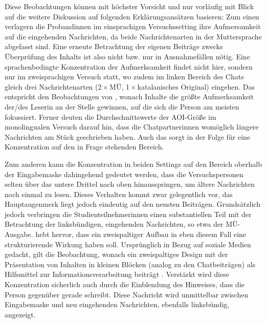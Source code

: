 \begin{sloppypar}
Diese Beobachtungen können mit höchster Vorsicht und nur vorläufig mit Blick auf die weitere Diskussion auf folgenden Erklärungsansätzen basieren: Zum einen verlagern die Proband{\textperiodcentered}innen im einsprachigen Versuchssetting ihre Aufmersamkeit auf die eingehenden Nachrichten, da beide Nachrichtenarten in der Muttersprache abgefasst sind. Eine erneute Betrachtung der eigenen Beiträge zwecks Überprüfung des Inhalts ist also nicht bzw. nur in Ausnahmefällen nötig. Eine sprachenbedingte Konzentration der Aufmerksamkeit findet nicht hier, sondern nur im zweisprachigen Versuch statt, wo zudem im linken Bereich des Chats gleich drei Nachrichtenarten (2\,$\times$\,MÜ, 1\,$\times$\,katalanisches Original) eingehen. Das entspricht den Beobachtungen von \citet[169]{bergstrom_chapter_2014}, wonach Inhalte die größte Aufmerksamkeit der/des Leser{\textperiodcentered}in an der Stelle gewinnen, auf die sich die Person am meisten fokussiert. Ferner deuten die Durchschnittswerte der AOI-Größe im monolingualen Versuch darauf hin, dass die Chatpartner{\textperiodcentered}innen womöglich längere Nachrichten am Stück geschrieben haben. Auch das sorgt in der Folge für eine Konzentration auf den in Frage stehenden Bereich.
\end{sloppypar}

Zum anderen kann die Konzentration in beiden Settings auf den Bereich oberhalb der Eingabemaske dahingehend gedeutet werden, dass die Versuchspersonen selten über das untere Drittel nach oben hinausspringen, um ältere Nachrichten noch einmal zu lesen. Dieses Verhalten kommt zwar gelegentlich vor, das Hauptaugenmerk liegt jedoch eindeutig auf den neusten Beiträgen. Grundsätzlich jedoch verbringen die Studienteilnehmer{\textperiodcentered}innen einen substantiellen Teil mit der Betrachtung der linksbündigen, eingehenden Nachrichten, so etwa der MÜ-Ausgabe. \citet[229]{bergstrom_9_2014} hebt hervor, dass ein zweispaltiger Aufbau in eben diesem Fall eine strukturierende Wirkung haben soll. Ursprünglich in Bezug auf soziale Medien gedacht, gilt die Beobachtung, wonach ein zweispaltiges Design mit der Präsentation von Inhalten in kleinen Blöcken (analog zu den Chatbeiträgen) als Hilfsmittel zur Informationsverarbeitung beiträgt \citep[229\psq]{bergstrom_9_2014}. Verstärkt wird diese Konzentration sicherlich auch durch die Einblendung des Hinweises, dass die Person gegenüber gerade schreibt. Diese Nachricht wird unmittelbar zwischen Eingabemaske und neu eingehenden Nachrichten, ebenfalls linksbündig, angezeigt.


